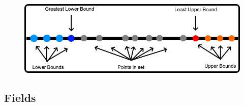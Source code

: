 	\begin{figure}[h]
		\centering
		\includegraphics[scale=0.45]{Images/1.2.2.png}
	\end{figure}

	\vspace{0.5cm}





\subsection{ Fields }

